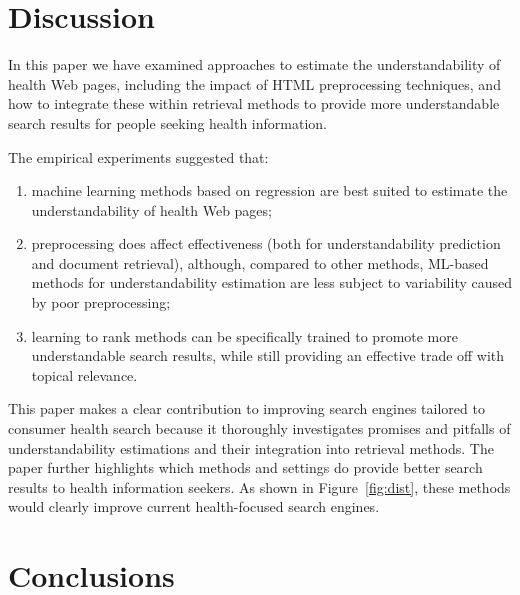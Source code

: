 
\section*{Discussion}



In this paper we have examined approaches to estimate the understandability of health Web pages, including the impact of HTML preprocessing techniques, and how to integrate these within retrieval methods to provide more understandable search results for people seeking health information. 


The empirical experiments suggested that:

\vspace{-4pt}
\begin{enumerate}[leftmargin=*]
	\item machine learning methods based on regression are best suited to estimate the understandability of health Web pages;
	\item preprocessing does affect effectiveness (both for understandability prediction and document retrieval), although, compared to other methods, ML-based methods for understandability estimation are less subject to variability caused by poor preprocessing;
	\item learning to rank methods can be specifically trained to promote more understandable search results, while still providing an effective trade off with topical relevance.
\end{enumerate} 

This paper makes a clear contribution to improving search engines tailored to consumer health search because it thoroughly investigates promises and pitfalls of understandability estimations and their integration into retrieval methods. The paper further highlights which methods and settings do provide better search results to health information seekers. As shown in Figure~\ref{fig:dist}, these methods would clearly improve current health-focused search engines. 


\section*{Conclusions}